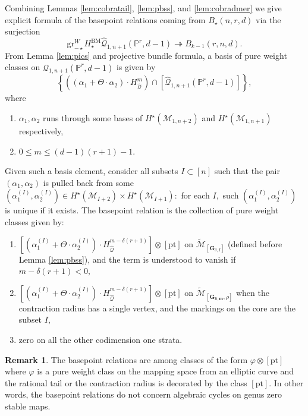 \documentclass[12pt,reqno]{amsart}
\theoremstyle{definition}
\theoremstyle{definition}
\theoremstyle{definition}
\theoremstyle{definition}
\newtheorem{remark}[theorem]{Remark}
\newcommand{\PP}{\mathbb{P}}
\newcommand{\Mtil}{\widetilde{\mathcal{M}}}
\newcommand{\gr}{\mathrm{gr}}
\begin{document}
Combining Lemmas \ref{lem:cobratail}, \ref{lem:pbss}, and \ref{lem:cobradmer} we give explicit formula of the basepoint relations coming from $B_{\star}(n,r,d)$ via the surjection $$\gr^W_{-\star}H_{\star}^{\mathrm{BM}}\hat{\mathcal{Q}}_{1,n+1}(\PP^r,d-1)\twoheadrightarrow B_{k-1}(r,n,d).$$ From Lemma \ref{lem:pics} and projective bundle formula, a basis of pure weight classes on $\hat{\mathcal{Q}}_{1,n+1}(\PP^r,d-1)$ is given by $$\left\{\left((\alpha_1 + \Theta\cdot \alpha_2)\cdot H_{\hat{\mathcal{Q}}}^m\right)\cap [\hat{\mathcal{Q}}_{1,n+1}(\PP^r,d-1)]\right\},$$ where \begin{enumerate}
  \item $\alpha_1,\alpha_2$ runs through some bases of $H^\star(\mathcal{M}_{1,n+2})$ and $H^\star(\mathcal{M}_{1,n+1})$ respectively,
  \item $0\leq m\leq (d-1)(r+1)-1.$
\end{enumerate}
Given such a basis element, consider all subsets $I\subset [n]$ such that the pair $(\alpha_1,\alpha_2)$ is pulled back from some $(\alpha_1^{(I)}, \alpha_2^{(I)})\in H^\star(\mathcal{M}_{I+2})\times H^\star(\mathcal{M}_{I+1}):$ for each $I,$ such $(\alpha_1^{(I)}, \alpha_2^{(I)})$ is unique if it exists. The basepoint relation is the collection of pure weight classes given by:
\begin{enumerate}
  \item $[(\alpha_1^{(I)}+\Theta \cdot \alpha_2^{(I)})\cdot H_{\hat{\mathcal{Q}}}^{m-\delta(r+1)}]\otimes [\mathrm{pt}]$ on $\Mtil_{[\mathbf{G}_{\delta, I}]}$ (defined before Lemma \ref{lem:pbss}), and the term is understood to vanish if $m-\delta(r+1)<0,$
  \item $[(\alpha_1^{(I)}+\Theta \cdot \alpha_2^{(I)})\cdot H_{\hat{\mathcal{Q}}}^{m-\delta(r+1)}]\otimes [\mathrm{pt}]$ on $\Mtil_{[\mathbf{G}_{\boldsymbol{\delta},\boldsymbol{m}},\rho]}$ when the contraction radius has a single vertex, and the markings on the core are the subset $I,$
  \item zero on all the other codimension one strata.
\end{enumerate}

\begin{remark}
  The basepoint relations are among classes of the form $\varphi\otimes [\mathrm{pt}]$ where $\varphi$ is a pure weight class on the mapping space from an elliptic curve and the rational tail or the contraction radius is decorated by the class $[\mathrm{pt}].$ In other words, the basepoint relations do not concern algebraic cycles on genus zero stable maps.
\end{remark}
\end{document}
